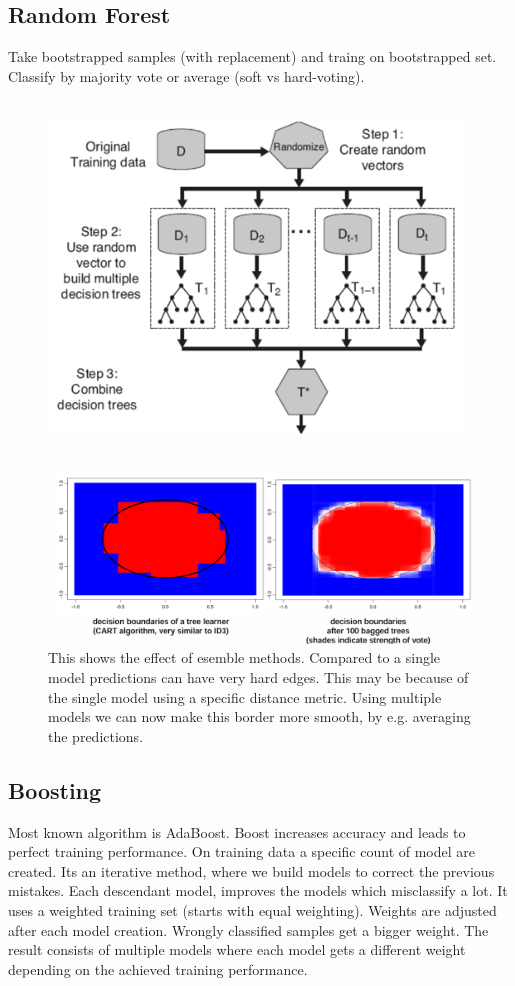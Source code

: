 \documentclass[../Main.tex]{subfiles}
\begin{document}
\subsection{Random Forest}
Take bootstrapped samples (with replacement) and traing on bootstrapped set.
Classify by majority vote or average (soft vs hard-voting).

\begin{figure}[H]
    \centering
    \includegraphics[width=0.75\linewidth]{Images/datan/random-forest.png}
\end{figure}

\begin{figure}[H]
    \centering
    \includegraphics[width=0.75\linewidth]{Images/datan/ensemble.png}
    \caption{This shows the effect of esemble methods. Compared to a single model predictions can have
    very hard edges. This may be because of the single model using a specific distance metric.
    Using multiple models we can now make this border more smooth, by e.g. averaging the predictions.}
\end{figure}


\subsection{Boosting}
Most known algorithm is AdaBoost. Boost increases accuracy and leads to
perfect training performance. On training data a specific count of model are created.
Its an iterative method, where we build models to correct the previous mistakes.
Each descendant model, improves the models which misclassify a lot.
It uses a weighted training set (starts with equal weighting).
Weights are adjusted after each model creation.
Wrongly classified samples get a bigger weight.
The result consists of multiple models where each model gets a different weight
depending on the achieved training performance.
\end{document}
